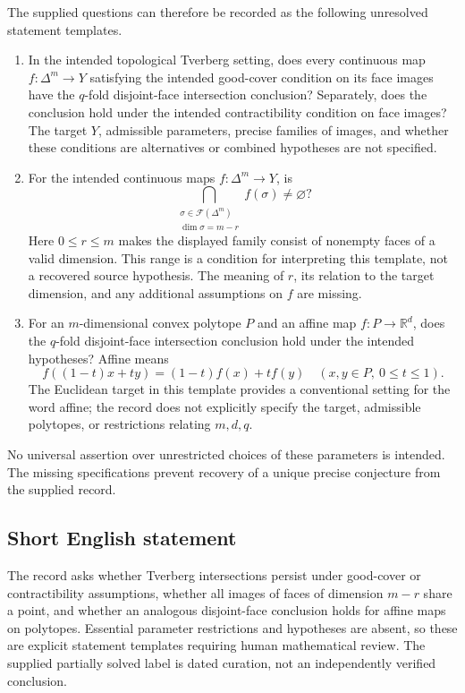 \documentclass[11pt]{article}
\newcommand{\R}{\mathbb{R}}
\begin{document}
The supplied questions can therefore be recorded as the following unresolved statement templates.
\begin{enumerate}
\item In the intended topological Tverberg setting, does every continuous map \(f:\Delta^m\to Y\) satisfying the intended good-cover condition on its face images have the \(q\)-fold disjoint-face intersection conclusion? Separately, does the conclusion hold under the intended contractibility condition on face images? The target \(Y\), admissible parameters, precise families of images, and whether these conditions are alternatives or combined hypotheses are not specified.
\item For the intended continuous maps \(f:\Delta^m\to Y\), is
\[
\bigcap_{\substack{\sigma\in\mathcal F(\Delta^m)\\ \dim\sigma=m-r}}
 f(\sigma)\ne\varnothing?
\]
Here \(0\le r\le m\) makes the displayed family consist of nonempty faces of a valid dimension. This range is a condition for interpreting this template, not a recovered source hypothesis. The meaning of \(r\), its relation to the target dimension, and any additional assumptions on \(f\) are missing.
\item For an \(m\)-dimensional convex polytope \(P\) and an affine map \(f:P\to\R^d\), does the \(q\)-fold disjoint-face intersection conclusion hold under the intended hypotheses? Affine means
\[
f((1-t)x+ty)=(1-t)f(x)+tf(y)
\quad(x,y\in P,\ 0\le t\le1).
\]
The Euclidean target in this template provides a conventional setting for the word affine; the record does not explicitly specify the target, admissible polytopes, or restrictions relating \(m,d,q\).
\end{enumerate}
No universal assertion over unrestricted choices of these parameters is intended. The missing specifications prevent recovery of a unique precise conjecture from the supplied record.
\subsection{Short English statement}
The record asks whether Tverberg intersections persist under good-cover or contractibility assumptions, whether all images of faces of dimension \(m-r\) share a point, and whether an analogous disjoint-face conclusion holds for affine maps on polytopes. Essential parameter restrictions and hypotheses are absent, so these are explicit statement templates requiring human mathematical review. The supplied partially solved label is dated curation, not an independently verified conclusion.
\end{document}
